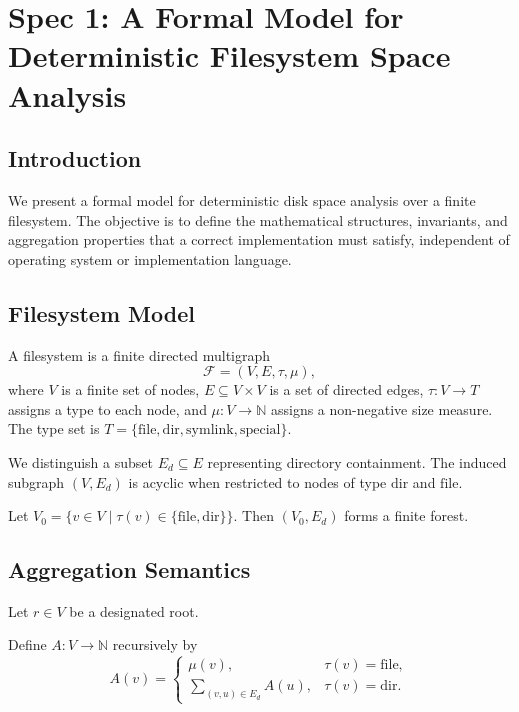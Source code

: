 \section*{Spec 1: A Formal Model for Deterministic Filesystem Space Analysis}

\subsection*{Introduction}

We present a formal model for deterministic disk space analysis over a finite filesystem.
The objective is to define the mathematical structures, invariants, and aggregation
properties that a correct implementation must satisfy, independent of operating system or implementation language.

\subsection*{Filesystem Model}

\begin{definition}
A filesystem is a finite directed multigraph
\[
\mathcal{F} = (V, E, \tau, \mu),
\]
where $V$ is a finite set of nodes, $E \subseteq V \times V$ is a set of directed edges,
$\tau : V \to T$ assigns a type to each node, and
$\mu : V \to \mathbb{N}$ assigns a non-negative size measure.
The type set is $T = \{\mathrm{file}, \mathrm{dir}, \mathrm{symlink}, \mathrm{special}\}$.
\end{definition}

We distinguish a subset $E_d \subseteq E$ representing directory containment.
The induced subgraph $(V, E_d)$ is acyclic when restricted to nodes of type $\mathrm{dir}$ and $\mathrm{file}$.

\begin{definition}
Let $V_0 = \{ v \in V \mid \tau(v) \in \{\mathrm{file}, \mathrm{dir}\} \}$.
Then $(V_0, E_d)$ forms a finite forest.
\end{definition}

\subsection*{Aggregation Semantics}

Let $r \in V$ be a designated root.

\begin{definition}
Define $A : V \to \mathbb{N}$ recursively by
\[
A(v) =
\begin{cases}
\mu(v), & \tau(v) = \mathrm{file}, \\
\sum_{(v,u) \in E_d} A(u), & \tau(v) = \mathrm{dir}.
\end{cases}
\]
\end{definition}

